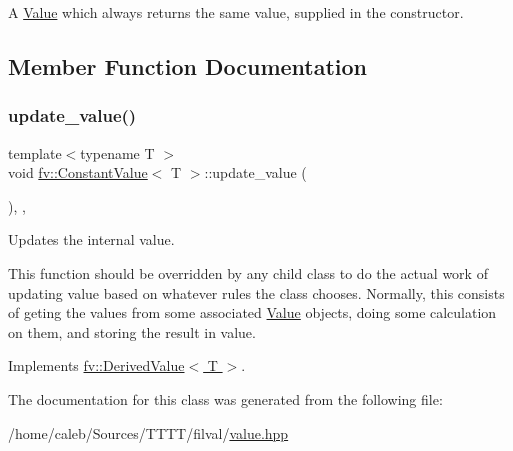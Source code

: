 A \hyperlink{classfv_1_1Value}{Value} which always returns the same value, supplied in the constructor. 

\subsection{Member Function Documentation}
\hypertarget{classfv_1_1ConstantValue_a6581e7fb69c082c07c9714138063b320}{}\label{classfv_1_1ConstantValue_a6581e7fb69c082c07c9714138063b320} 
\subsubsection{\texorpdfstring{update\+\_\+value()}{update\_value()}}
{\footnotesize\ttfamily template$<$typename T $>$ \\
void \hyperlink{classfv_1_1ConstantValue}{fv\+::\+Constant\+Value}$<$ T $>$\+::update\+\_\+value (\begin{DoxyParamCaption}{ }\end{DoxyParamCaption})\hspace{0.3cm}{\ttfamily [inline]}, {\ttfamily [protected]}, {\ttfamily [virtual]}}



Updates the internal value. 

This function should be overridden by any child class to do the actual work of updating value based on whatever rules the class chooses. Normally, this consists of geting the values from some associated \hyperlink{classfv_1_1Value}{Value} objects, doing some calculation on them, and storing the result in value. 

Implements \hyperlink{classfv_1_1DerivedValue_ae59e80a98eb74b95d8961bfe12ee5ec2}{fv\+::\+Derived\+Value$<$ T $>$}.



The documentation for this class was generated from the following file\+:\begin{DoxyCompactItemize}
\item 
/home/caleb/\+Sources/\+T\+T\+T\+T/filval/\hyperlink{value_8hpp}{value.\+hpp}\end{DoxyCompactItemize}
